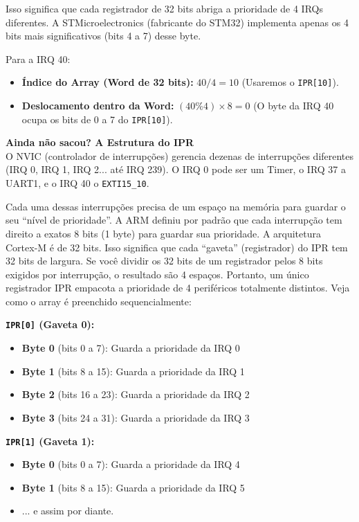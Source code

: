 \documentclass[12pt,a4paper]{article}
\begin{document}
Isso significa que cada registrador de 32 bits abriga a prioridade de 4 IRQs diferentes. A STMicroelectronics (fabricante do STM32) implementa apenas os 4 bits mais significativos (bits 4 a 7) desse byte.

Para a IRQ 40:
\begin{itemize}
    \item \textbf{Índice do Array (Word de 32 bits):} $40 / 4 = 10$ (Usaremos o \texttt{IPR[10]}).
    \item \textbf{Deslocamento dentro da Word:} $(40 \% 4) \times 8 = 0$ (O byte da IRQ 40 ocupa os bits de 0 a 7 do \texttt{IPR[10]}).
\end{itemize}



\textbf{Ainda não sacou? A Estrutura do IPR}\\
O NVIC (controlador de interrupções) gerencia dezenas de interrupções diferentes (IRQ 0, IRQ 1, IRQ 2... até IRQ 239). O IRQ 0 pode ser um Timer, o IRQ 37 a UART1, e o IRQ 40 o \texttt{EXTI15\_10}.

Cada uma dessas interrupções precisa de um espaço na memória para guardar o seu ``nível de prioridade''. A ARM definiu por padrão que cada interrupção tem direito a exatos 8 bits (1 byte) para guardar sua prioridade.
A arquitetura Cortex-M é de 32 bits. Isso significa que cada ``gaveta'' (registrador) do IPR tem 32 bits de largura. Se você dividir os 32 bits de um registrador pelos 8 bits exigidos por interrupção, o resultado são 4 espaços.
Portanto, um único registrador IPR empacota a prioridade de 4 periféricos totalmente distintos. Veja como o array é preenchido sequencialmente:

\textbf{\texttt{IPR[0]} (Gaveta 0):}
\begin{itemize}
    \item \textbf{Byte 0} (bits 0 a 7): Guarda a prioridade da IRQ 0
    \item \textbf{Byte 1} (bits 8 a 15): Guarda a prioridade da IRQ 1
    \item \textbf{Byte 2} (bits 16 a 23): Guarda a prioridade da IRQ 2
    \item \textbf{Byte 3} (bits 24 a 31): Guarda a prioridade da IRQ 3
\end{itemize}

\textbf{\texttt{IPR[1]} (Gaveta 1):}
\begin{itemize}
    \item \textbf{Byte 0} (bits 0 a 7): Guarda a prioridade da IRQ 4
    \item \textbf{Byte 1} (bits 8 a 15): Guarda a prioridade da IRQ 5
    \item ... e assim por diante.
\end{itemize}
\end{document}
